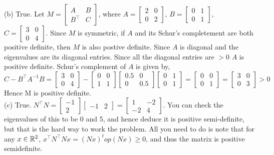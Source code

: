 \documentclass[letterpaper]{article}
\begin{document}
(b) True. Let $ M = \begin{bmatrix} A & B \\ B^\top & C\end{bmatrix}$, where $ A = \begin{bmatrix} 2 & 0 \\ 0 & 2\end{bmatrix}$, $ B = \begin{bmatrix} 0 & 1 \\ 0 & 1\end{bmatrix}$, $ C = \begin{bmatrix} 3 & 0 \\ 0 & 4\end{bmatrix}$. Since $M$ is symmetric, if $A$ and its Schur's completement are both positive definite, then $M$ is also postive definite. Since $A$ is diagonal and the eigenvalues are its diagonal entries. Since all the diagonal entries are $> 0$ $A $ is positive definite.  Schur's complement of $A $ is given by,  $$C - B^\top A^{-1}B= \begin{bmatrix} 3 & 0 \\ 0 & 4\end{bmatrix} - \begin{bmatrix} 0 & 0 \\ 1 & 1\end{bmatrix} \begin{bmatrix} 0.5 & 0 \\ 0 & 0.5\end{bmatrix} \begin{bmatrix} 0 & 1 \\ 0 & 1\end{bmatrix}= \begin{bmatrix} 0 & 0 \\ 0 & 1\end{bmatrix} = \begin{bmatrix} 3 & 0 \\ 0 & 3\end{bmatrix} >0 $$
Hence M is positive definite.\\

(c) True. $N^\top N = \begin{bmatrix} -1 \\ 2 \end{bmatrix} \begin{bmatrix} -1 & 2 \end{bmatrix} = \begin{bmatrix} 1 & -2  \\ -2 & 4\end{bmatrix}$. You can check the eigenvalues of this to be 0 and 5, and hence deduce it is positive semi-definite, but that is the hard way to work the problem. All you need to do is note that for any $x\in \mathbb R^2$,  $x^\top N^\top N x = (Nx)^top (Nx)\ge 0$, and thus the matrix is positive semidefinite.\\
\end{document}
